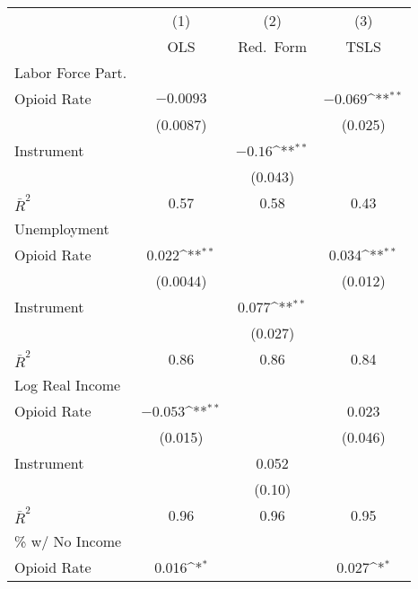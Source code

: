 {
\def\sym#1{\ifmmode^{#1}\else\(^{#1}\)\fi}
\begin{tabular}{l*{3}{c}}
\hline\hline
            &\multicolumn{1}{c}{(1)}&\multicolumn{1}{c}{(2)}&\multicolumn{1}{c}{(3)}\\
            &\multicolumn{1}{c}{OLS}&\multicolumn{1}{c}{Red.\ Form}&\multicolumn{1}{c}{TSLS}\\
\hline\hline
Labor Force Part.\\
\hline
Opioid Rate &     $-0.0093$        &                    &      $-0.069$\sym{**}\\
            &    (0.0087)        &                    &     (0.025)        \\
[1em]
Instrument  &                    &       $-0.16$\sym{**}&                    \\
            &                    &     (0.043)        &                    \\
\hline
$\bar{R}^2$ &        0.57        &        0.58        &        0.43        \\
\hline\hline
Unemployment \\
\hline
Opioid Rate &       0.022\sym{**}&                    &       0.034\sym{**}\\
            &    (0.0044)        &                    &     (0.012)        \\
[1em]
Instrument  &                    &       0.077\sym{**}&                    \\
            &                    &     (0.027)        &                    \\
\hline
$\bar{R}^2$ &        0.86        &        0.86        &        0.84        \\
\hline\hline
Log Real Income \\
\hline
Opioid Rate &      $-0.053$\sym{**}&                    &       0.023        \\
            &     (0.015)        &                    &     (0.046)        \\
[1em]
Instrument  &                    &       0.052        &                    \\
            &                    &      (0.10)        &                    \\
\hline
$\bar{R}^2$ &        0.96        &        0.96        &        0.95        \\
\hline\hline
\% w/ No Income\\
\hline
Opioid Rate &       0.016\sym{*} &                    &       0.027\sym{*} \\

\end{tabular}}
